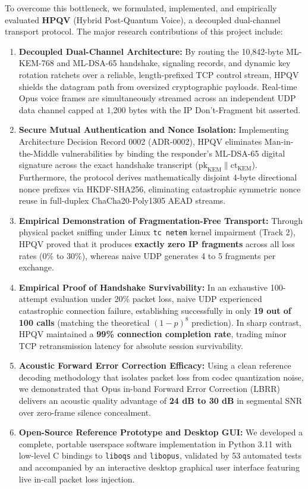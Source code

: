 To overcome this bottleneck, we formulated, implemented, and empirically evaluated \textbf{HPQV} (Hybrid Post-Quantum Voice), a decoupled dual-channel transport protocol. The major research contributions of this project include:
\begin{enumerate}
    \item \textbf{Decoupled Dual-Channel Architecture:} By routing the 10,842-byte ML-KEM-768 and ML-DSA-65 handshake, signaling records, and dynamic key rotation ratchets over a reliable, length-prefixed TCP control stream, HPQV shields the datagram path from oversized cryptographic payloads. Real-time Opus voice frames are simultaneously streamed across an independent UDP data channel capped at 1,200 bytes with the IP Don't-Fragment bit asserted.
    \item \textbf{Secure Mutual Authentication and Nonce Isolation:} Implementing Architecture Decision Record 0002 (ADR-0002), HPQV eliminates Man-in-the-Middle vulnerabilities by binding the responder's ML-DSA-65 digital signature across the exact handshake transcript ($\text{pk}_{\text{KEM}} \parallel \text{ct}_{\text{KEM}}$). Furthermore, the protocol derives mathematically disjoint 4-byte directional nonce prefixes via HKDF-SHA256, eliminating catastrophic symmetric nonce reuse in full-duplex ChaCha20-Poly1305 AEAD streams.
    \item \textbf{Empirical Demonstration of Fragmentation-Free Transport:} Through physical packet sniffing under Linux \texttt{tc netem} kernel impairment (Track 2), HPQV proved that it produces \textbf{exactly zero IP fragments} across all loss rates (0\% to 30\%), whereas naive UDP generates 4 to 5 fragments per exchange.
    \item \textbf{Empirical Proof of Handshake Survivability:} In an exhaustive 100-attempt evaluation under 20\% packet loss, naive UDP experienced catastrophic connection failure, establishing successfully in only \textbf{19 out of 100 calls} (matching the theoretical $(1-p)^8$ prediction). In sharp contrast, HPQV maintained a \textbf{99\% connection completion rate}, trading minor TCP retransmission latency for absolute session survivability.
    \item \textbf{Acoustic Forward Error Correction Efficacy:} Using a clean reference decoding methodology that isolates packet loss from codec quantization noise, we demonstrated that Opus in-band Forward Error Correction (LBRR) delivers an acoustic quality advantage of \textbf{24 dB to 30 dB} in segmental SNR over zero-frame silence concealment.
    \item \textbf{Open-Source Reference Prototype and Desktop GUI:} We developed a complete, portable userspace software implementation in Python 3.11 with low-level C bindings to \texttt{liboqs} and \texttt{libopus}, validated by 53 automated tests and accompanied by an interactive desktop graphical user interface featuring live in-call packet loss injection.
\end{enumerate}

